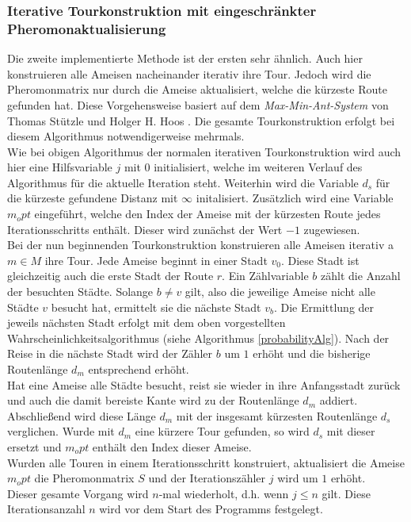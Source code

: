 \documentclass[doktyp=barbeit, sprache=german]{TUBAFarbeiten}
\begin{document}
\subsubsection{Iterative Tourkonstruktion mit eingeschränkter Pheromonaktualisierung}
Die zweite implementierte Methode ist der ersten sehr ähnlich. Auch hier konstruieren alle Ameisen nacheinander iterativ ihre Tour. Jedoch wird die Pheromonmatrix nur durch die Ameise aktualisiert, welche die kürzeste Route gefunden hat. Diese Vorgehensweise basiert auf dem \textit{Max-Min-Ant-System} von Thomas Stützle und Holger H. Hoos \cite{MaxMin}. Die gesamte Tourkonstruktion erfolgt bei diesem Algorithmus notwendigerweise mehrmals. 
\\Wie bei obigen Algorithmus der normalen iterativen Tourkonstruktion wird auch hier eine Hilfsvariable $j$ mit $0$ initialisiert, welche im weiteren Verlauf des Algorithmus für die aktuelle Iteration steht. Weiterhin wird die Variable $d_s$ für die kürzeste gefundene Distanz mit $\infty$ initalisiert. Zusätzlich wird eine Variable $m_opt$ eingeführt, welche den Index der Ameise mit der kürzesten Route jedes Iterationsschritts enthält. Dieser wird zunächst der Wert $-1$ zugewiesen.
\\Bei der nun beginnenden Tourkonstruktion konstruieren alle Ameisen iterativ a$m \in M$ ihre Tour. Jede Ameise beginnt in einer Stadt $v_0$. Diese Stadt ist gleichzeitig auch die erste Stadt der Route $r$. Ein Zählvariable $b$ zählt die Anzahl der besuchten Städte. Solange $b \neq v$ gilt, also die jeweilige Ameise nicht alle Städte $v$ besucht hat, ermittelt sie die nächste Stadt $v_b$. Die Ermittlung der jeweils nächsten Stadt erfolgt mit dem oben vorgestellten Wahrscheinlichkeitsalgorithmus (siehe Algorithmus \ref{probabilityAlg}). Nach der Reise in die nächste Stadt wird der Zähler $b$ um $1$ erhöht und die bisherige Routenlänge $d_m$ entsprechend erhöht.
\\Hat eine Ameise alle Städte besucht, reist sie wieder in ihre Anfangsstadt zurück und auch die damit bereiste Kante wird zu der Routenlänge $d_m$ addiert. Abschließend wird diese Länge $d_m$ mit der insgesamt kürzesten Routenlänge $d_s$ verglichen. Wurde mit $d_m$ eine kürzere Tour gefunden, so wird $d_s$ mit dieser ersetzt und $m_opt$ enthält den Index dieser Ameise. 
\\Wurden alle Touren in einem Iterationsschritt konstruiert, aktualisiert die Ameise $m_opt$ die Pheromonmatrix $S$ und der Iterationszähler $j$ wird um $1$ erhöht. 
\\Dieser gesamte Vorgang wird $n$-mal wiederholt, d.h. wenn $j \leq n$ gilt. Diese Iterationsanzahl $n$ wird vor dem Start des Programms festgelegt. 
\end{document}
